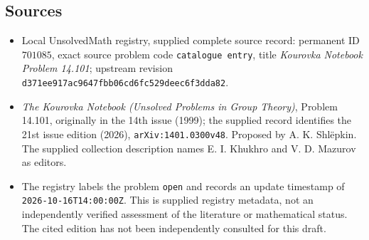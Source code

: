 \documentclass[11pt]{article}
\begin{document}
\subsection{Sources}
\begin{itemize}
\item Local UnsolvedMath registry, supplied complete source record: permanent ID \(701085\), exact source problem code \texttt{catalogue entry}, title \emph{Kourovka Notebook Problem 14.101}; upstream revision \texttt{d371ee917ac9647fbb06cd6fc529deec6f3dda82}.
\item \emph{The Kourovka Notebook (Unsolved Problems in Group Theory)}, Problem 14.101, originally in the 14th issue (1999); the supplied record identifies the 21st issue edition (2026), \texttt{arXiv:1401.0300v48}. Proposed by A. K. Shl\"epkin. The supplied collection description names E. I. Khukhro and V. D. Mazurov as editors.
\item The registry labels the problem \texttt{open} and records an update timestamp of \texttt{2026-10-16T14:00:00Z}. This is supplied registry metadata, not an independently verified assessment of the literature or mathematical status. The cited edition has not been independently consulted for this draft.
\end{itemize}
\end{document}
